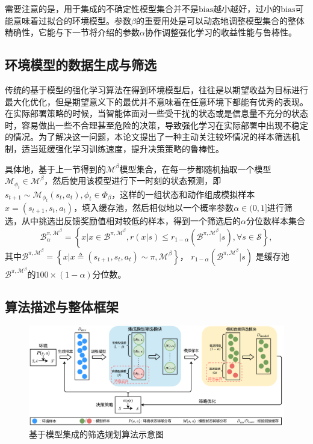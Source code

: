 需要注意的是，用于集成的不确定性模型集合并不是$\mathrm{bias}$越小越好，过小的$\mathrm{bias}$可能意味着过拟合的环境模型。参数$\beta$的重要用处是可以动态地调整模型集合的整体精确性，它能与下一节将介绍的参数$\alpha$协作调整强化学习的收益性能与鲁棒性。

\subsection{环境模型的数据生成与筛选}\label{sec:rollout-method}

传统的基于模型的强化学习算法在得到环境模型后，往往是以期望收益为目标进行最大化优化，但是期望意义下的最优并不意味着在任意环境下都能有优秀的表现。在实际部署策略的时候，当智能体面对一些受干扰的状态或是信息量不充分的状态时，容易做出一些不合理甚至危险的决策，导致强化学习在实际部署中出现不稳定的情况\cite{zhang2021mbdp}。为了解决这一问题，本论文提出了一种主动关注较坏情况的样本筛选机制，适当延缓强化学习训练速度，提升决策策略的鲁棒性。

具体地，基于上一节得到的$\mathcal{M}^{\beta}$模型集合，在每一步都随机抽取一个模型$\mathcal{M}_{\phi_i}\in\mathcal{M}^\beta$，然后使用该模型进行下一时刻的状态预测，即$s_{t+1}\sim \mathcal{M}_{\phi_t}(s_t,a_t), \phi_t\in\Phi_\beta$，这样的一组状态和动作组成模拟样本$x=\left(s_{t+1},s_t,a_t\right)$，填入缓存池，然后相似地以一个概率参数$\alpha\in(0,1]$进行筛选，从中挑选出反馈奖励值相对较低的样本，得到一个筛选后的$\alpha$分位数样本集合
\begin{equation}
    \mathcal{B}_\alpha^{\pi,\mathcal{M}^\beta}=\left\{x|x\in\mathcal{B}^{\pi,\mathcal{M}^\beta},r(x|s)\leq r_{1-\alpha}(\mathcal{B}^{\pi,\mathcal{M}^\beta}|s), \forall s \in \mathcal{S}\right\},
\end{equation}
其中$\mathcal{B}^{\pi,\mathcal{M}^\beta}=\left\{x|x\triangleq\left(s_{t+1},s_t,a_t\right)\sim\pi,\mathcal{M}^\beta\right\}$， $r_{1-\alpha}(\mathcal{B}^{\pi,\mathcal{M}^\beta}|s)$ 是缓存池 $\mathcal{B}^{\pi,\mathcal{M}^\beta}$的$100\times(1-\alpha)$分位数。

\subsection{算法描述与整体框架}\label{sec:mbdp-description}

\begin{figure}[t]
\centering
\includegraphics[width=\textwidth]{figures/mbdp.pdf}
\caption{基于模型集成的筛选规划算法示意图}
\label{fig:mbdp-structure}
\end{figure}


